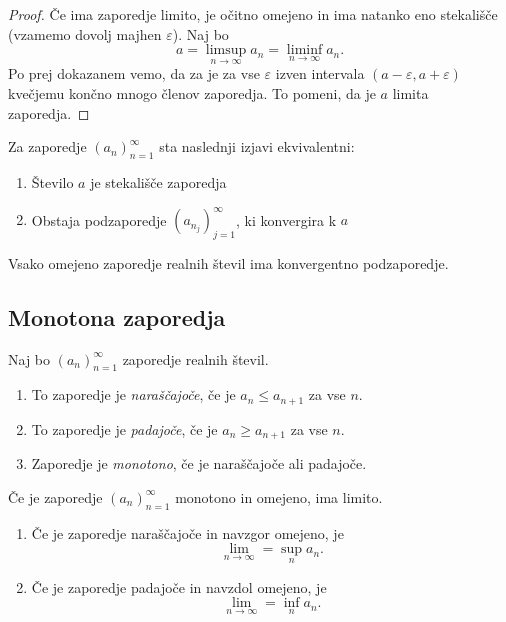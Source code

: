 \documentclass[12pt, a4paper]{article}
\begin{document}
\begin{proof}
Če ima zaporedje limito, je očitno omejeno in ima natanko eno stekališče (vzamemo dovolj majhen $\varepsilon$). Naj bo
\[
a=\limsup_{n\to\infty}a_n=\liminf_{n\to\infty}a_n.
\]
Po prej dokazanem vemo, da za je za vse $\varepsilon$ izven intervala $(a-\varepsilon, a+\varepsilon)$ kvečjemu končno mnogo členov zaporedja. To pomeni, da je $a$ limita zaporedja.
\end{proof}

\begin{izrek}
Za zaporedje $(a_n)_{n=1}^\infty$ sta naslednji izjavi ekvivalentni:

\begin{enumerate}[label=(\arabic*)]
\item Število $a$ je stekališče zaporedja
\item Obstaja podzaporedje $(a_{n_j})_{j=1}^\infty$, ki konvergira k $a$
\end{enumerate}
\end{izrek}

\obvs

\begin{posledica}
Vsako omejeno zaporedje realnih števil ima konvergentno podzaporedje.
\end{posledica}

\newpage

\subsection{Monotona zaporedja}

\begin{definicija}
Naj bo $(a_n)_{n=1}^\infty$ zaporedje realnih števil.

\begin{enumerate}[label=\arabic*)]
\item To zaporedje je \emph{naraščajoče}, če je $a_n\leq a_{n+1}$ za vse $n$.
\item To zaporedje je \emph{padajoče}, če je $a_n\geq a_{n+1}$ za vse $n$.
\item Zaporedje je \emph{monotono}, če je naraščajoče ali padajoče.
\end{enumerate}
\end{definicija}

\begin{izrek}
Če je zaporedje $(a_n)_{n=1}^\infty$ monotono in omejeno, ima limito.

\begin{enumerate}[label=\arabic*)]
\item Če je zaporedje naraščajoče in navzgor omejeno, je
\[
\lim_{n\to\infty}=\sup_na_n.
\]
\item Če je zaporedje padajoče in navzdol omejeno, je
\[
\lim_{n\to\infty}=\inf_na_n.
\]
\end{enumerate}
\end{izrek}
\end{document}
